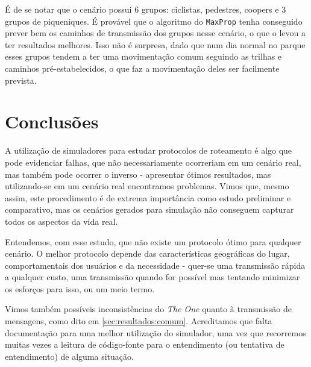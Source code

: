 \documentclass[conference]{IEEEtran}
\begin{document}
É de se notar que o cenário possui 6 grupos: ciclistas, pedestres, coopers e 3 grupos de piqueniques. É provável que o algoritmo do \texttt{MaxProp} tenha conseguido prever
bem os caminhos de transmissão dos grupos nesse cenário, o que o levou a ter resultados melhores. Isso não é surpresa, dado que num dia normal no parque esses grupos tendem
a ter uma movimentação comum seguindo as trilhas e caminhos pré-estabelecidos, o que faz a movimentação deles ser facilmente prevista. 

\section{Conclusões}
A utilização de simuladores para estudar protocolos de roteamento é algo que pode evidenciar falhas, que não necessariamente ocorreriam em um cenário real, mas também pode ocorrer o inverso - apresentar ótimos resultados, mas utilizando-se em um cenário real encontramos problemas. Vimos que, mesmo assim, este procedimento é de extrema importância como estudo preliminar e comparativo, mas os cenários gerados para simulação não conseguem capturar todos os aspectos da vida real.

Entendemos, com esse estudo, que não existe um protocolo ótimo para qualquer cenário. O melhor protocolo depende das características geográficas do lugar, comportamentais dos usuários e da necessidade - quer-se uma transmissão rápida a qualquer custo, uma transmissão quando for possível mas tentando minimizar os esforços para isso, ou um meio termo.

Vimos também possíveis inconsistências do \emph{The One} quanto à transmissão de mensagens, como dito em \ref{sec:resultados:comum}. 
Acreditamos que falta documentação para uma melhor utilização do simulador, uma vez que recorremos muitas vezes a leitura de código-fonte para o entendimento (ou tentativa de entendimento) de alguma situação.

%
%
\end{document}
